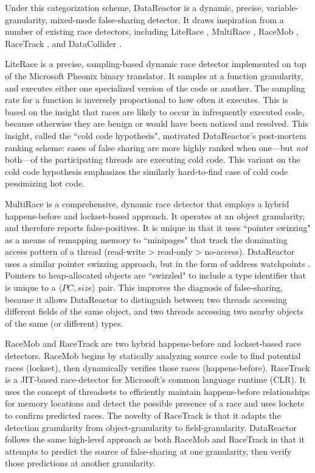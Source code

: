 \documentclass{sig-alternate}
\newcommand{\Toolname}{DataReactor}
\begin{document}
Under this categorization scheme, \Toolname{} is a dynamic, precise, variable-granularity, mixed-mode
false-sharing detector. It draws inspiration from a number of existing race detectors, including LiteRace
\cite{LiteRace}, MultiRace \cite{MultiRace}, RaceMob \cite{RaceMob}, RaceTrack \cite{RaceTrack}, and
DataCollider \cite{DataCollider}.

LiteRace \cite{LiteRace} is a precise, sampling-based dynamic race detector implemented on top of the Microsoft
Pheonix binary translator. It samples at a function granularity, and executes either one specialized version of the
code or another. The sampling rate for a function is inversely proportional to how often it executes. This is based
on the insight that races are likely to occur in infrequently executed code, because otherwise they are benign or
would have been noticed and resolved. This insight, called the ``cold code hypothesis", motivated \Toolname's
post-mortem ranking scheme: cases of false sharing are more highly ranked when one---but \emph{not} both---of
the participating threads are executing cold code. This variant on the cold code hypothesis emphasizes the similarly
hard-to-find case of cold code pessimizing hot code.

\newcommand\TypeIdPair{$\langle PC,size \rangle$ }

MultiRace \cite{MultiRace} is a comprehensive, dynamic race detector that employs a hybrid happens-before and
lockset-based approach. It operates at an object granularity, and therefore reports false-positives. It is unique
in that it uses ``pointer swizzing" as a means of remapping memory to ``minipages" that track the dominating
access pattern of a thread (read-write > read-only > no-access). \Toolname{} uses a similar pointer swizzing approach, but
in the form of address watchpoints \cite{AddressWatchpoints}. Pointers to heap-allocated objects are ``swizzled" to
include a type identifier that is unique to a \TypeIdPair{} pair. This improves the diagnosis of false-sharing,
because it allows \Toolname{} to distinguish between two threads accessing different fields of the same object, and
two threads accessing two nearby objects of the same (or different) types.

RaceMob \cite{RaceMob} and RaceTrack \cite{RaceTrack} are two hybrid happens-before and lockset-based race detectors.
RaceMob begins by statically analyzing source code to find potential races (lockset), then dynamically verifies those races
(happens-before). RaceTrack is a JIT-based race-detector for Microsoft's common language runtime (CLR). It uses the
concept of threadsets to efficiently maintain happens-before relationships for memory locations and detect the possible
presence of a race and uses lockets to confirm predicted races. The novelty of RaceTrack is that it adapts the detection
granularity from object-granularity to field-granularity. \Toolname{} follows the same high-level approach as both RaceMob
and RaceTrack in that it attempts to predict the source of false-sharing at one granularity, then verify those predictions 
at another granularity.
\end{document}
